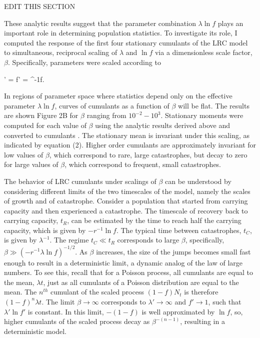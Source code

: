 EDIT THIS SECTION

These analytic results suggest that the parameter combination $\lambda\ln f$ plays an important role in determining population statistics.  To investigate its role, I computed the response of the first four stationary cumulants of the LRC model to simultaneous, reciprocal scaling of $\lambda$ and $\ln f$ via a dimensionless scale factor, $\beta$.  Specifically, parameters were scaled according to

\be
\lambda' = \beta\lambda \text{,\hspace{1cm}} \ln f' = \beta^{-1}\ln f.
\ee

In regions of parameter space where statistics depend only on the effective parameter $\lambda\ln f$, curves of cumulants as a function of $\beta$ will be flat.  The results are shown Figure 2B for $\beta$ ranging from $10^{-2}-10^3$.  Stationary moments were computed for each value of $\beta$ using the analytic results derived above and converted to cumulants \cite{broca2004cumulant}.  The stationary mean is invariant under this scaling, as indicated by equation (2).  Higher order cumulants are approximately invariant for low values of $\beta$, which correspond to rare, large catastrophes, but decay to zero for large values of $\beta$, which correspond to frequent, small catastrophes.  

The behavior of LRC cumulants under scalings of $\beta$ can be understood by considering different limits of the two timescales of the model, namely the scales of growth and of catastrophe.  Consider a population that started from carrying capacity and then experienced a catastrophe.   The timescale of recovery back to carrying capacity, $t_R$, can be estimated by the time to reach half the carrying capacity, which is given by $-r^{-1}\ln f$.  The typical time between catastrophes, $t_C$, is given by $\lambda^{-1}$.  The regime $t_C \ll t_R$ corresponds to large $\beta$, specifically, $\beta \gg (-r^{-1}\lambda\ln f)^{-1/2}$.  As $\beta$ increases, the size of the jumps becomes small fast enough to result in a deterministic limit, a dynamic analog of the law of large numbers.  To see this, recall that for a Poisson process, all cumulants are equal to the mean, $\lambda t$, just as all cumulants of a Poisson distribution are equal to the mean.  The $n^{th}$ cumulant of the scaled process $(1-f)N_t$ is therefore $(1-f)^n\lambda t$. The limit $\beta \to \infty$ corresponds to $\lambda'\to\infty$ and $f'\to 1$, such that $\lambda'\ln f'$ is constant.  In this limit, $-(1-f)$ is well approximated by $\ln f$, so, higher cumulants of the scaled process decay as $\beta^{-(n-1)}$, resulting in a deterministic model. 

